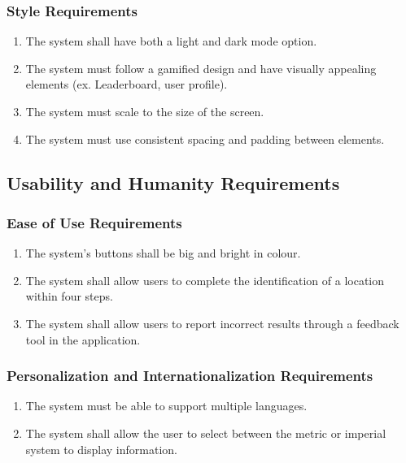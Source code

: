 \documentclass[]{article}
\begin{document}
\subsubsection{Style Requirements}
\label{ssub:style_requirements}
\begin{enumerate}[{LF-S}1. ]
	\item The system shall have both a light and dark mode option.
	\item The system must follow a gamified design and have visually appealing elements (ex. Leaderboard, user profile).
	\item The system must scale to the size of the screen.
	\item The system must use consistent spacing and padding between elements.
\end{enumerate}


\subsection{Usability and Humanity Requirements}
\label{sub:usability_and_humanity_requirements}

\subsubsection{Ease of Use Requirements}
\label{ssub:ease_of_use_requirements}
\begin{enumerate}[{UH-EOU}1. ]
	\item The system’s buttons shall be big and bright in colour.
	\item The system shall allow users to complete the identification of a location within four steps.
	\item The system shall allow users to report incorrect results through a feedback tool in the application.
\end{enumerate}

\subsubsection{Personalization and Internationalization Requirements}
\label{ssub:personalization_and_internationalization_requirements}
\begin{enumerate}[{UH-PI}1. ]
	\item The system must be able to support multiple languages.
	\item The system shall allow the user to select between the metric or imperial system to display information.
\end{enumerate}
\end{document}
